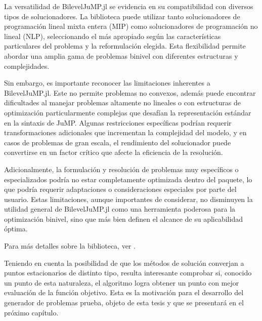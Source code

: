La versatilidad de BilevelJuMP.jl se evidencia en su compatibilidad con diversos tipos de solucionadores. La biblioteca puede utilizar tanto solucionadores de programación lineal mixta entera (MIP) como solucionadores de programación no lineal (NLP), seleccionando el más apropiado según las características particulares del problema y la reformulación elegida. Esta flexibilidad permite abordar una amplia gama de problemas binivel con diferentes estructuras y complejidades.

Sin embargo, es importante reconocer las limitaciones inherentes a BilevelJuMP.jl. Este no permite problemas no convexos, además puede encontrar dificultades al manejar problemas altamente no lineales o con estructuras de optimización particularmente complejas que desafían la representación estándar en la sintaxis de JuMP. Algunas restricciones específicas podrían requerir transformaciones adicionales que incrementan la complejidad del modelo, y en casos de problemas de gran escala, el rendimiento del solucionador puede convertirse en un factor crítico que afecte la eficiencia de la resolución.

Adicionalmente, la formulación y resolución de problemas muy específicos o especializados podría no estar completamente optimizada dentro del paquete, lo que podría requerir adaptaciones o consideraciones especiales por parte del usuario. Estas limitaciones, aunque importantes de considerar, no disminuyen la utilidad general de BilevelJuMP.jl como una herramienta poderosa para la optimización binivel, sino que más bien definen el alcance de su aplicabilidad óptima.

Para más detalles sobre la biblioteca, ver \cite{BilevelJump}.


Teniendo en cuenta la posibilidad de que los métodos de solución converjan a puntos estacionarios de distinto tipo, resulta interesante comprobar si, conocido un punto de esta naturaleza, el algoritmo logra obtener un punto con  mejor evaluación de la función objetivo. Esta es la motivación para el desarrollo del generador de problemas prueba, objeto de esta tesis y que se presentará en el próximo capítulo.

